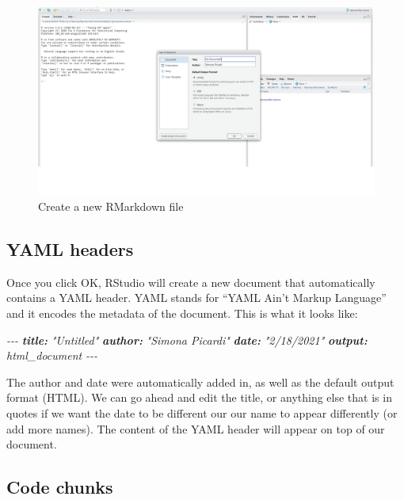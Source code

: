 \documentclass[
]{book}
\newenvironment{Shaded}{\begin{snugshade}}{\end{snugshade}}
\newcommand{\AnnotationTok}[1]{\textcolor[rgb]{0.56,0.35,0.01}{\textbf{\textit{#1}}}}
\newcommand{\CommentTok}[1]{\textcolor[rgb]{0.56,0.35,0.01}{\textit{#1}}}
\begin{document}
\begin{figure}

{\centering \includegraphics[width=1\linewidth]{img/rmarkdown2} 

}

\caption{Create a new RMarkdown file}\label{fig:rmarkdown2}
\end{figure}

\hypertarget{yaml-headers}{%
\subsection{YAML headers}\label{yaml-headers}}

Once you click OK, RStudio will create a new document that automatically
contains a YAML header. YAML stands for ``YAML Ain't Markup Language'' and it
encodes the metadata of the document. This is what it looks like:

\begin{Shaded}
\begin{Highlighting}[]
\CommentTok{{-}{-}{-}}
\AnnotationTok{title:}\CommentTok{ "Untitled"}
\AnnotationTok{author:}\CommentTok{ "Simona Picardi"}
\AnnotationTok{date:}\CommentTok{ "2/18/2021"}
\AnnotationTok{output:}\CommentTok{ html\_document}
\CommentTok{{-}{-}{-}}
\end{Highlighting}
\end{Shaded}

The author and date were automatically added in, as well as the default output
format (HTML). We can go ahead and edit the title, or anything else that is in
quotes if we want the date to be different our our name to appear differently
(or add more names). The content of the YAML header will appear on top of our
document.

\hypertarget{code-chunks}{%
\subsection{Code chunks}\label{code-chunks}}
\end{document}
